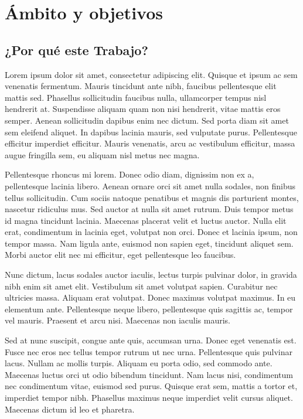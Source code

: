 \chapter{Ámbito y objetivos}
\label{cap2} 

\section{¿Por qué este Trabajo?}

Lorem ipsum dolor sit amet, consectetur adipiscing elit. Quisque et ipsum ac
sem venenatis fermentum. Mauris tincidunt ante nibh, faucibus pellentesque elit
mattis sed. Phasellus sollicitudin faucibus nulla, ullamcorper tempus nisl
hendrerit at. Suspendisse aliquam quam non nisi hendrerit, vitae mattis eros
semper. Aenean sollicitudin dapibus enim nec dictum. Sed porta diam sit amet
sem eleifend aliquet. In dapibus lacinia mauris, sed vulputate purus.
Pellentesque efficitur imperdiet efficitur. Mauris venenatis, arcu ac
vestibulum efficitur, massa augue fringilla sem, eu aliquam nisl metus nec
magna.

Pellentesque rhoncus mi lorem. Donec odio diam, dignissim non ex a,
pellentesque lacinia libero. Aenean ornare orci sit amet nulla sodales, non
finibus tellus sollicitudin. Cum sociis natoque penatibus et magnis dis
parturient montes, nascetur ridiculus mus. Sed auctor at nulla sit amet rutrum.
Duis tempor metus id magna tincidunt lacinia. Maecenas placerat velit et luctus
auctor. Nulla elit erat, condimentum in lacinia eget, volutpat non orci. Donec
et lacinia ipsum, non tempor massa. Nam ligula ante, euismod non sapien eget,
tincidunt aliquet sem. Morbi auctor elit nec mi efficitur, eget pellentesque
leo faucibus.

Nunc dictum, lacus sodales auctor iaculis, lectus turpis pulvinar dolor, in
gravida nibh enim sit amet elit. Vestibulum sit amet volutpat sapien. Curabitur
nec ultricies massa. Aliquam erat volutpat. Donec maximus volutpat maximus. In
eu elementum ante. Pellentesque neque libero, pellentesque quis sagittis ac,
tempor vel mauris. Praesent et arcu nisi. Maecenas non iaculis mauris.

Sed at nunc suscipit, congue ante quis, accumsan urna. Donec eget venenatis
est. Fusce nec eros nec tellus tempor rutrum ut nec urna. Pellentesque quis
pulvinar lacus. Nullam ac mollis turpis. Aliquam eu porta odio, sed commodo
ante. Maecenas luctus orci ut odio bibendum tincidunt. Nam lacus nisi,
condimentum nec condimentum vitae, euismod sed purus. Quisque erat sem, mattis
a tortor et, imperdiet tempor nibh. Phasellus maximus neque imperdiet velit
cursus aliquet. Maecenas dictum id leo et pharetra.

